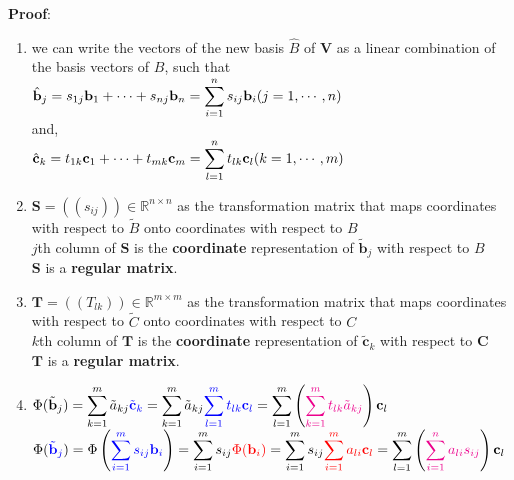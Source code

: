 \vspace{0.2cm}
\noindent \textbf{Proof}:
\begin{enumerate}
    \item we can write the vectors of the new basis $\hat{\mathit{B}}$ of $\mathbf{V}$ as a linear combination of the basis vectors of $\mathit{B}$, such that\\
    \(
        \displaystyle \hat{\mathbf{b}}_j = s_{1j}\mathbf{b}_1 + \cdots + s_{nj}\mathbf{b}_n = \sum_{i=1}^{n} s_{ij}\mathbf{b}_i \hfill (j = 1,\cdots,n)
    \)\\
    and,\\
    \(
        \displaystyle \hat{\mathbf{c}}_k = t_{1k}\mathbf{c}_1 + \cdots + t_{mk}\mathbf{c}_m = \sum_{l=1}^{n} t_{lk}\mathbf{c}_l \hfill (k = 1,\cdots,m)
    \)

    \item $\mathbf{S} = ((s_{ij})) \in \mathbb{R}^{n\times n}$ as the transformation matrix that maps coordinates with respect to $\tilde{\mathit{B}}$ onto coordinates with respect to $\mathit{B}$\\
    $j$th column of $\mathbf{S}$ is the \textbf{coordinate} representation of  $\tilde{\mathbf{b}}_j$ with respect to $\mathit{B}$\\
    $\mathbf{S}$ is a \textbf{regular matrix}.
    
    
    \item $\mathbf{T} = ((T_{lk})) \in \mathbb{R}^{m\times m}$ as the transformation matrix that maps coordinates with respect to $\tilde{\mathit{C}}$ onto coordinates with respect to $\mathit{C}$\\
    $k$th column of $\mathbf{T}$ is the \textbf{coordinate} representation of $\tilde{\mathbf{c}}_k$ with respect to $\mathbf{C}$\\
    $\mathbf{T}$ is a \textbf{regular matrix}.

    \item \( \displaystyle
        \Phi(\tilde{\mathbf{b}}_j) = \sum_{k=1}^{m} \tilde{a}_{kj}\textcolor{blue}{\tilde{\mathbf{c}}_k} = \sum_{k=1}^{m} \tilde{a}_{kj} \textcolor{blue}{\sum_{l=1}^{m} t_{lk} \mathbf{c}_l} = \sum_{l=1}^{m}\dParenBrac{ \textcolor{Magenta}{\sum_{k=1}^{m} t_{lk}\tilde{a}_{kj}} }\mathbf{c}_l
    \)  \\
    \( \displaystyle
     \Phi(\textcolor{blue}{\tilde{\mathbf{b}}_j}) = \Phi \dParenBrac{ \textcolor{blue}{\sum_{i=1}^{m} s_{ij}\mathbf{b}_i} } = \sum_{i=1}^{m} s_{ij} \textcolor{red}{\Phi(\mathbf{b}_i)} = \sum_{i=1}^{m} s_{ij} \textcolor{red}{\sum_{i=1}^{m} a_{li}\mathbf{c}_l} = \sum_{l=1}^{m}\dParenBrac{ \textcolor{Magenta}{\sum_{i=1}^{n} a_{li}s_{ij}} }\mathbf{c}_l
    \)


\end{enumerate}
